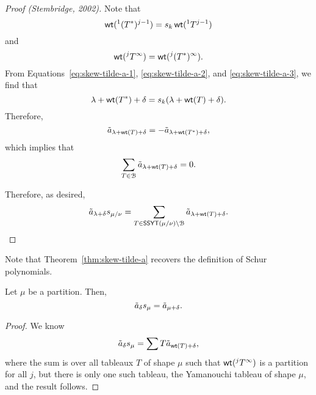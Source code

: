 \begin{proof}[Proof (Stembridge, 2002)]
    Note that
    \begin{equation} \label{eq:skew-tilde-a-2}
        \operatorname{\mathsf{wt}}(^1(T^*)^{j-1}) = s_k \operatorname{\mathsf{wt}}(^1T^{j-1})
    \end{equation}
    and
    \begin{equation} \label{eq:skew-tilde-a-3}
        \operatorname{\mathsf{wt}}(^jT^\infty) = \operatorname{\mathsf{wt}}(^j(T^*)^\infty).
    \end{equation}
    From Equations~\eqref{eq:skew-tilde-a-1}, \eqref{eq:skew-tilde-a-2}, and \eqref{eq:skew-tilde-a-3}, we find that
    \begin{equation}
        \lambda + \operatorname{\mathsf{wt}}(T^*) + \delta = s_k(\lambda + \operatorname{\mathsf{wt}}(T) + \delta).
    \end{equation}
    Therefore,
    \begin{equation}
        \tilde{a}_{\lambda + \operatorname{\mathsf{wt}}(T) + \delta}
        =
        - \tilde{a}_{\lambda + \operatorname{\mathsf{wt}}(T^*) + \delta},
    \end{equation}
    which implies that
    \begin{equation}
        \sum_{T \in \mathcal{B}} \tilde{a}_{\lambda + \operatorname{\mathsf{wt}}(T) + \delta} = 0.
    \end{equation}

    Therefore, as desired,
    \begin{equation}
        \tilde{a}_{\lambda + \delta} s_{\mu/\nu}
        =
        \sum_{T \in \operatorname{\mathsf{SSYT}}(\mu/\nu) \setminus \mathcal{B}}
        \tilde{a}_{\lambda + \operatorname{\mathsf{wt}}(T) + \delta}.
    \end{equation}
\end{proof}

Note that Theorem~\ref{thm:skew-tilde-a} recovers the definition of Schur polynomials.

\begin{corollary}
    Let \(\mu\) be a partition.
    Then,
    \begin{equation}
        \tilde{a}_{\delta} s_{\mu} = \tilde{a}_{\mu + \delta}.
    \end{equation}
\end{corollary}

\begin{proof}
    We know
    \begin{equation}
        \tilde{a}_{\delta} s_{\mu} = \sum{T} \tilde{a}_{\operatorname{\mathsf{wt}}(T) + \delta},
    \end{equation}
    where the sum is over all tableaux \(T\) of shape \(\mu\) such that \(\operatorname{\mathsf{wt}}(^jT^\infty)\) is a partition for all \(j\),
    but there is only one such tableau, the Yamanouchi tableau of shape \(\mu\),
    and the result follows.
\end{proof}

